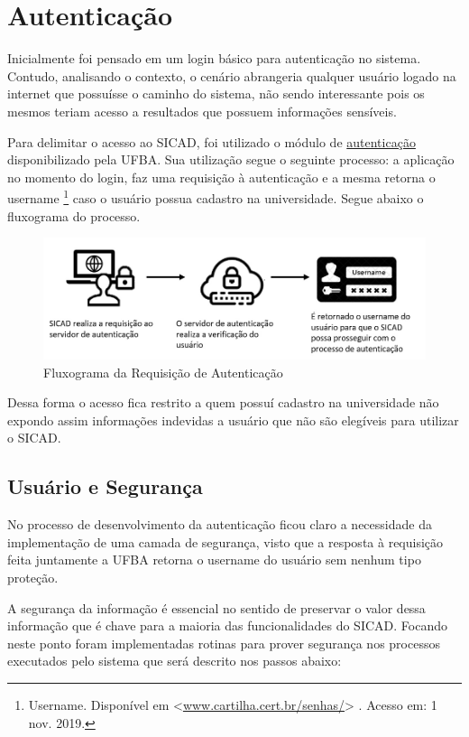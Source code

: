 \documentclass[12pt, a4paper]{report}
\begin{document}
\section{ Autenticação}
\par Inicialmente foi pensado em um login básico para autenticação no sistema. Contudo, analisando o contexto, o cenário abrangeria qualquer usuário logado na internet que possuísse o caminho do sistema, não sendo interessante pois os mesmos teriam acesso a resultados que possuem informações sensíveis.
\par Para delimitar o acesso ao SICAD, foi utilizado o módulo de \href{https://www.autenticacao.ufba.br}{autenticação} disponibilizado pela UFBA. Sua utilização segue o seguinte processo: a aplicação no momento do login, faz uma requisição à autenticação e a mesma retorna o username \footnote{Username. Disponível em <\url{www.cartilha.cert.br/senhas/}> . Acesso em: 1 nov. 2019.} caso o usuário possua cadastro na universidade. Segue abaixo o fluxograma do processo.
\begin{figure}[!ht]
\centering
\includegraphics[scale=0.50]{processo_autenticacao.jpg}
\caption{Fluxograma da Requisição de Autenticação}
\label{fig:processo_autenticacao}
\end{figure}

\par Dessa forma o acesso fica restrito a quem possuí cadastro na universidade não expondo assim informações indevidas a usuário que não são elegíveis para utilizar o SICAD.

\subsection{Usuário e Segurança}
\par No processo de desenvolvimento  da autenticação ficou claro a necessidade da implementação de uma camada de segurança, visto que a resposta à requisição feita juntamente a UFBA retorna o username do usuário sem nenhum tipo proteção.
\par A segurança da informação é essencial no sentido de preservar o valor dessa informação que é chave para a maioria das funcionalidades do SICAD. Focando neste ponto foram implementadas rotinas para prover segurança nos processos executados pelo sistema que será descrito nos passos abaixo:
\end{document}
